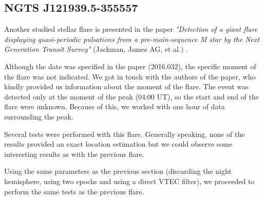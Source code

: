 
\subsection{NGTS J121939.5-355557}

Another studied stellar flare is presented in the paper \textit{"Detection of a giant flare displaying quasi-periodic pulsations from a pre-main-sequence M star by the Next Generation Transit Survey"} (Jackman, James AG, et al.) \cite{jackman2018detection}. 

Although the date was specified in the paper (2016.032), the specific moment of the flare was not indicated. We got in touch with the authors of the paper, who kindly provided us information about the moment of the flare. The event was detected only at the moment of the peak (04:00 UT), so the start and end of the flare were unknown. Because of this, we worked with one hour of data surrounding the peak.

Several tests were performed with this flare. Generally speaking, none of the results provided an exact location estimation but we could observe some interesting results as with the previous flare.

Using the same parameters as the previous section (discarding the night hemisphere, using two epochs and using a direct VTEC filter), we proceeded to perform the same tests as the previous flare.

